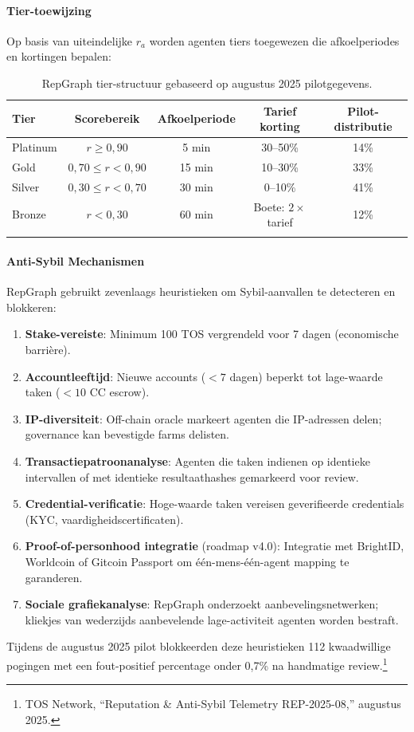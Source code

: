 \documentclass[11pt]{article}
\begin{document}
\paragraph{Tier-toewijzing} Op basis van uiteindelijke $r_a$ worden agenten tiers toegewezen die afkoelperiodes en kortingen bepalen:
\begin{longtable}{@{}lcccc@{}}
\toprule
\textbf{Tier} & \textbf{Scorebereik} & \textbf{Afkoelperiode} & \textbf{Tarief korting} & \textbf{Pilot-distributie} \\\midrule
Platinum & $r \geq 0,90$ & 5 min & 30--50\% & 14\% \\
Gold & $0,70 \leq r < 0,90$ & 15 min & 10--30\% & 33\% \\
Silver & $0,30 \leq r < 0,70$ & 30 min & 0--10\% & 41\% \\
Bronze & $r < 0,30$ & 60 min & Boete: $2 \times$ tarief & 12\% \\\bottomrule
\caption{RepGraph tier-structuur gebaseerd op augustus 2025 pilotgegevens.}
\label{tab:reputation-tiers}
\end{longtable}

\paragraph{Anti-Sybil Mechanismen} RepGraph gebruikt zevenlaags heuristieken om Sybil-aanvallen te detecteren en blokkeren:
\begin{enumerate}[noitemsep]
  \item \textbf{Stake-vereiste}: Minimum 100 TOS vergrendeld voor 7 dagen (economische barrière).
  \item \textbf{Accountleeftijd}: Nieuwe accounts ($<7$ dagen) beperkt tot lage-waarde taken ($<10$ CC escrow).
  \item \textbf{IP-diversiteit}: Off-chain oracle markeert agenten die IP-adressen delen; governance kan bevestigde farms delisten.
  \item \textbf{Transactiepatroonanalyse}: Agenten die taken indienen op identieke intervallen of met identieke resultaathashes gemarkeerd voor review.
  \item \textbf{Credential-verificatie}: Hoge-waarde taken vereisen geverifieerde credentials (KYC, vaardigheidscertificaten).
  \item \textbf{Proof-of-personhood integratie} (roadmap v4.0): Integratie met BrightID, Worldcoin of Gitcoin Passport om één-mens-één-agent mapping te garanderen.
  \item \textbf{Sociale grafiekanalyse}: RepGraph onderzoekt aanbevelingsnetwerken; kliekjes van wederzijds aanbevelende lage-activiteit agenten worden bestraft.
\end{enumerate}
Tijdens de augustus 2025 pilot blokkeerden deze heuristieken 112 kwaadwillige pogingen met een fout-positief percentage onder 0,7\% na handmatige review.\footnote{TOS Network, ``Reputation \& Anti-Sybil Telemetry REP-2025-08,'' augustus 2025.}
\end{document}
